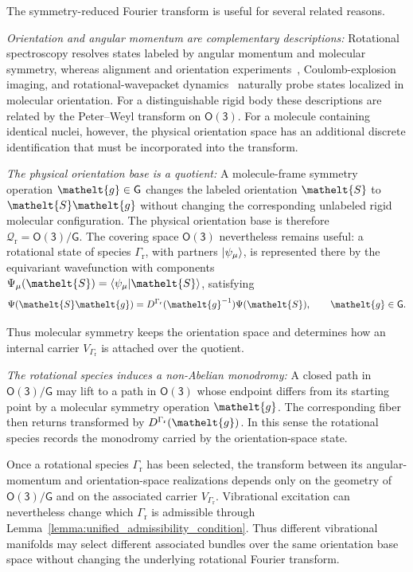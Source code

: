 \documentclass[
  reprint,
  aps,
  prx,
  superscriptaddress,
  amsmath,
  amssymb,
  longbibliography
]{revtex4-2}
\newcommand{\eltfont}[1]{{\let\sigma\eltsigma\mathelt{#1}}}
\newcommand{\grp}[1]{\mathsf{#1}}
\newcommand{\elt}[1]{\eltfont{#1}}
\newcommand{\repD}[1]{D^{#1}}
\newcommand{\gel}{\elt{g}}             %
\newcommand{\orient}{\elt{S}}          %
\providecommand{\Grot}{\Gamma_{\mathrm{r}}}
\begin{document}
The symmetry-reduced Fourier transform is useful for several related reasons.

\emph{Orientation and angular momentum are complementary descriptions:}
Rotational spectroscopy resolves states labeled by angular momentum and molecular symmetry, whereas alignment and orientation experiments~\cite{Friedrich1991, Loesch1990, Larsen2000}, Coulomb-explosion imaging, and rotational-wavepacket dynamics~\cite{Dooley2003} naturally probe states localized in molecular orientation. For a distinguishable rigid body these descriptions are related by the Peter--Weyl transform on \(\grp{O(3)}\). For a molecule containing identical nuclei, however, the physical orientation space has an additional discrete identification that must be incorporated into the transform.

\emph{The physical orientation base is a quotient:}
A molecule-frame symmetry operation \(\gel\in\grp{G}\) changes the labeled orientation \(\orient\) to \(\orient\gel\) without changing the corresponding unlabeled rigid molecular configuration. The physical orientation base is therefore
\(
\mathcal Q_{\mathrm r}=\grp{O(3)}/\grp{G}.
\)
The covering space \(\grp{O(3)}\) nevertheless remains useful: a rotational state of species \(\Grot\), with partners \(\ket{\psi_\mu}\), is represented there by the equivariant wavefunction with components \(\Psi_\mu(\orient)=\braket{\psi_\mu|\orient}\), satisfying
\begin{equation}
\Psi(\orient\gel)
=
\repD{\Grot}(\gel^{-1})\Psi(\orient),
\qquad
\gel\in\grp{G}.
\label{eq:rot_equivariance}
\end{equation}

Thus molecular symmetry keeps the orientation space and determines how an internal carrier \(V_{\Grot}\) is attached over the quotient.

\emph{The rotational species induces a non-Abelian monodromy:}
A closed path in \(\grp{O(3)}/\grp{G}\) may lift to a path in \(\grp{O(3)}\) whose endpoint differs from its starting point by a molecular symmetry operation \(\gel\). The corresponding fiber then returns transformed by \(\repD{\Grot}(\gel)\). In this sense the rotational species records the monodromy carried by the orientation-space state.

Once a rotational species \(\Grot\) has been selected, the transform between its angular-momentum and orientation-space realizations depends only on the geometry of \(\grp{O(3)}/\grp{G}\) and on the associated carrier \(V_{\Grot}\). Vibrational excitation can nevertheless change which \(\Grot\) is admissible through Lemma~\ref{lemma:unified_admissibility_condition}. Thus different vibrational manifolds may select different associated bundles over the same orientation base space without changing the underlying rotational Fourier transform.
\end{document}
